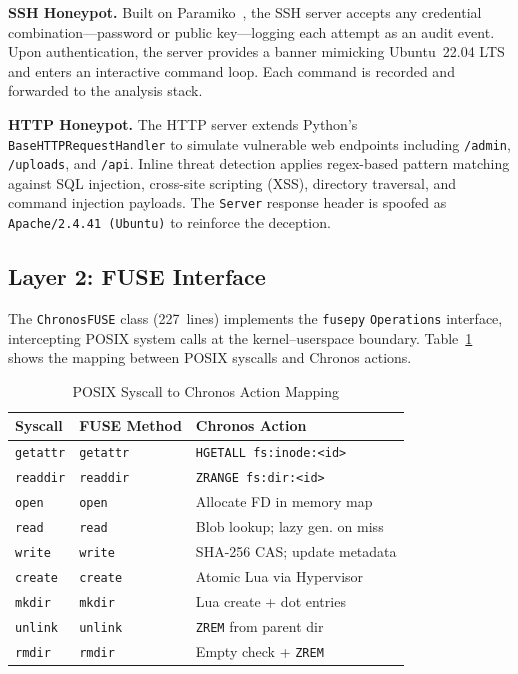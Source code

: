 \documentclass[conference]{IEEEtran}
\begin{document}
\textbf{SSH Honeypot.}
Built on Paramiko~\cite{paramiko2024}, the SSH server accepts any credential combination---password or public key---logging each attempt as an audit event.
Upon authentication, the server provides a banner mimicking Ubuntu~22.04 LTS and enters an interactive command loop.
Each command is recorded and forwarded to the analysis stack.

\textbf{HTTP Honeypot.}
The HTTP server extends Python's \texttt{BaseHTTPRequestHandler} to simulate vulnerable web endpoints including \texttt{/admin}, \texttt{/uploads}, and \texttt{/api}.
Inline threat detection applies regex-based pattern matching against SQL injection, cross-site scripting (XSS), directory traversal, and command injection payloads.
The \texttt{Server} response header is spoofed as \texttt{Apache/2.4.41 (Ubuntu)} to reinforce the deception.

\subsection{Layer 2: FUSE Interface}

The \texttt{ChronosFUSE} class (227~lines) implements the \texttt{fusepy} \texttt{Operations} interface, intercepting POSIX system calls at the kernel--userspace boundary.
Table~\ref{tab:syscall-mapping} shows the mapping between POSIX syscalls and Chronos actions.

\begin{table}[htbp]
\caption{POSIX Syscall to Chronos Action Mapping}
\label{tab:syscall-mapping}
\centering
\footnotesize
\begin{tabular}{@{}lll@{}}
\toprule
\textbf{Syscall} & \textbf{FUSE Method} & \textbf{Chronos Action} \\
\midrule
\texttt{getattr}  & \texttt{getattr}  & \texttt{HGETALL fs:inode:\textless id\textgreater} \\
\texttt{readdir}  & \texttt{readdir}  & \texttt{ZRANGE fs:dir:\textless id\textgreater} \\
\texttt{open}     & \texttt{open}     & Allocate FD in memory map \\
\texttt{read}     & \texttt{read}     & Blob lookup; lazy gen. on miss \\
\texttt{write}    & \texttt{write}    & SHA-256 CAS; update metadata \\
\texttt{create}   & \texttt{create}   & Atomic Lua via Hypervisor \\
\texttt{mkdir}    & \texttt{mkdir}    & Lua create + dot entries \\
\texttt{unlink}   & \texttt{unlink}   & \texttt{ZREM} from parent dir \\
\texttt{rmdir}    & \texttt{rmdir}    & Empty check + \texttt{ZREM} \\
\bottomrule
\end{tabular}
\end{table}
\end{document}
